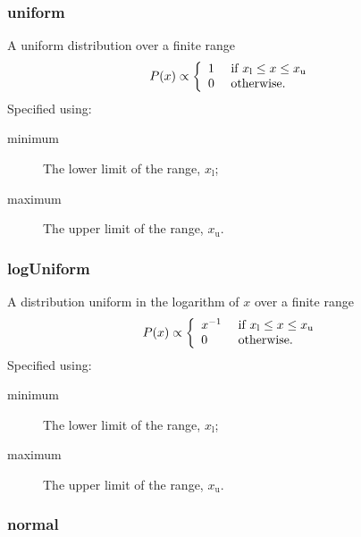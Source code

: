 \subsubsection{{\normalfont \ttfamily uniform}}

A uniform distribution over a finite range
\begin{equation}
P(x) \propto \left\{ \begin{array}{ll} 1 & \hbox{ if } x_\mathrm{l} \leq x \leq x_\mathrm{u} \\ 0 & \hbox{ otherwise.}  \end{array} \right.
\end{equation}
Specified using:
\begin{description}
\item[{\normalfont \ttfamily minimum}] The lower limit of the range, $x_\mathrm{l}$;
\item[{\normalfont \ttfamily maximum}] The upper limit of the range, $x_\mathrm{u}$.
\end{description}

\subsubsection{{\normalfont \ttfamily logUniform}}

A distribution uniform in the logarithm of $x$ over a finite range
\begin{equation}
P(x) \propto \left\{ \begin{array}{ll} x^{-1} & \hbox{ if } x_\mathrm{l} \leq x \leq x_\mathrm{u} \\ 0 & \hbox{ otherwise.}  \end{array} \right.
\end{equation}
Specified using:
\begin{description}
\item[{\normalfont \ttfamily minimum}] The lower limit of the range, $x_\mathrm{l}$;
\item[{\normalfont \ttfamily maximum}] The upper limit of the range, $x_\mathrm{u}$.
\end{description}

\subsubsection{{\normalfont \ttfamily normal}}

